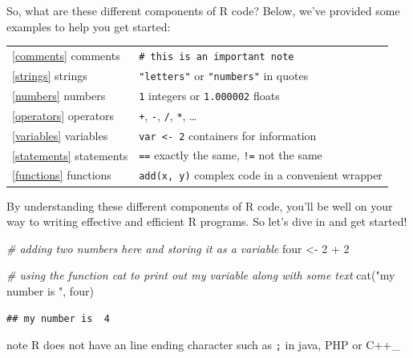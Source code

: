 \documentclass[
]{book}
\newenvironment{Shaded}{\begin{snugshade}}{\end{snugshade}}
\newcommand{\CommentTok}[1]{\textcolor[rgb]{0.56,0.35,0.01}{\textit{#1}}}
\newcommand{\DecValTok}[1]{\textcolor[rgb]{0.00,0.00,0.81}{#1}}
\newcommand{\FunctionTok}[1]{\textcolor[rgb]{0.00,0.00,0.00}{#1}}
\newcommand{\NormalTok}[1]{#1}
\newcommand{\OtherTok}[1]{\textcolor[rgb]{0.56,0.35,0.01}{#1}}
\newcommand{\SpecialCharTok}[1]{\textcolor[rgb]{0.00,0.00,0.00}{#1}}
\newcommand{\StringTok}[1]{\textcolor[rgb]{0.31,0.60,0.02}{#1}}
\begin{document}
So, what are these different components of R code? Below, we've provided some examples to help you get started:

\begin{longtable}[]{@{}
  >{\raggedright\arraybackslash}p{}
  >{\raggedright\arraybackslash}p{}@{}}
\toprule\noalign{}
\endhead
\bottomrule\noalign{}
\endlastfoot
\ref{comments} comments & \texttt{\#\ this\ is\ an\ important\ note} \\
\ref{strings} strings & \texttt{"letters"} or \texttt{"numbers"} in quotes \\
\ref{numbers} numbers & \texttt{1} integers or \texttt{1.000002} floats \\
\ref{operators} operators & \texttt{+}, \texttt{-}, \texttt{/}, \texttt{*}, \ldots{} \\
\ref{variables} variables & \texttt{var\ \textless{}-\ 2} containers for information \\
\ref{statements} statements & \texttt{==} exactly the same, \texttt{!=} not the same \\
\ref{functions} functions & \texttt{add(x,\ y)} complex code in a convenient wrapper \\
\end{longtable}

By understanding these different components of R code, you'll be well on your way to writing effective and efficient R programs. So let's dive in and get started!

\begin{Shaded}
\begin{Highlighting}[]
\CommentTok{\# adding two numbers here and storing it as a variable}
\NormalTok{four }\OtherTok{\textless{}{-}} \DecValTok{2} \SpecialCharTok{+} \DecValTok{2}

\CommentTok{\# using the function \textquotesingle{}cat\textquotesingle{} to print out my variable along with some text}
\FunctionTok{cat}\NormalTok{(}\StringTok{"my number is "}\NormalTok{, four)}
\end{Highlighting}
\end{Shaded}

\begin{verbatim}
## my number is  4
\end{verbatim}

\begin{infobox}{note}
R does not have an line ending character such as \texttt{;} in java, PHP or C++\_

\end{infobox}
\end{document}

